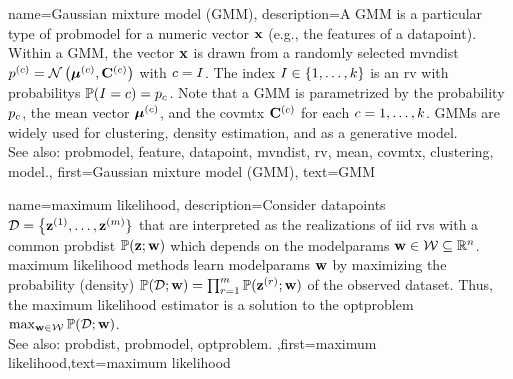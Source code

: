 {name={Gaussian mixture model (GMM)}, 
	description={A GMM 
		is a particular type of \gls{probmodel} for a numeric vector ${\bf x}$ (e.g., 
		the \glspl{feature} of a \gls{datapoint}). Within a GMM, the vector ${\bf x}$ is drawn from a randomly 
		selected \gls{mvndist} $p^{(c)} = \mathcal{N}\left({\bm \mu}^{(c)},\mathbf{C}^{(c)}\right)$ with 
		$c = I$. The index $I \in \{1, \ldots, k\}$ is an \gls{rv} with \glspl{probability} $\mathbb{P}({I=c}) = p_{c}$.
	     	Note that a GMM is parametrized by the \gls{probability} $p_{c}$, the 
		\gls{mean} vector ${\bm \mu}^{(c)}$, and the \gls{covmtx} $\mathbf{C}^{(c)}$ for each $c=1, \ldots, k$. 
		GMMs are widely used for \gls{clustering}, density estimation, and as a generative \gls{model}. 
				\\
		See also: \gls{probmodel}, \gls{feature}, \gls{datapoint}, \gls{mvndist}, \gls{rv}, \gls{mean}, \gls{covmtx}, \gls{clustering}, \gls{model}.},
	first={Gaussian mixture model (GMM)},
	text={GMM} 
}
 
{name={maximum likelihood}, 
 description={Consider \glspl{datapoint} $\mathcal{D}=\big\{ {\bf z}^{(1)}, \ldots, {\bf z}^{(m)} \}$ 
		that are interpreted as the \glspl{realization} of \gls{iid} \glspl{rv} with a common \gls{probdist} $\mathbb{P}({{\bf z}; {\bf w}})$ which 
		depends on the \gls{modelparams} ${\bf w} \in \mathcal{W} \subseteq \mathbb{R}^{n}$. 
		\Gls{maximum} likelihood methods learn \gls{modelparams} ${\bf w}$ by maximizing 
		the probability (density) $\mathbb{P}({\mathcal{D}; {\bf w}}) = \prod_{r=1}^{m} \mathbb{P}({{\bf z}^{(r)}; {\bf w}})$ 
		of the observed \gls{dataset}. Thus, the \gls{maximum} likelihood estimator is a 
		solution to the \gls{optproblem} $\max_{{\bf w} \in \mathcal{W}} \mathbb{P}({\mathcal{D}; {\bf w}})$.
				\\
		See also: \gls{probdist}, \gls{probmodel}, \gls{optproblem}.
	},first={maximum likelihood},text={maximum likelihood}}



